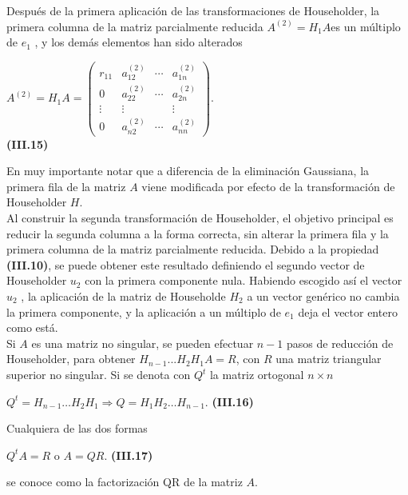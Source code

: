 \documentclass[twocolumn,twoside]{article}
\begin{document}
Despu\'es de la primera aplicaci\'on de las transformaciones de Householder, la primera
columna de la matriz parcialmente reducida $A^{(2)}=H_1 A $es un m\'ultiplo de $e_1$ , y los
dem\'as elementos han sido alterados
\begin{center}
  $A^{(2)}= H_1 A=\left(\begin{array}{cccc}
    r_{11} &a_{12}^{(2)} &\cdots &a_{1n}^{(2)} \\ 
    0 &a_{22}^{(2)} &\cdots &a_{2n}^{(2)} \\
    \vdots &\vdots &  &\vdots \\
    0 &a_{n2}^{(2)} &\cdots &a_{nn}^{(2)} 
   \end{array}\right)$. \vspace{0.2cm}\\\textbf{(III.15)}
\end{center}
En muy importante notar que a diferencia de la eliminaci\'on Gaussiana, la primera fila de
la matriz $A$ viene modificada por efecto de la transformaci\'on de Householder $H$.\\
Al construir la segunda transformaci\'on de Householder, el objetivo principal es reducir
la segunda columna a la forma correcta, sin alterar la primera fila y la primera
columna de la matriz parcialmente reducida. Debido a la propiedad \textbf{(III.10)}, se puede
obtener este resultado definiendo el segundo vector de Householder $u_2$ con la primera
componente nula. Habiendo escogido as\'i el vector $u_2$ , la aplicaci\'on de la matriz de
Householde $H_2$ a un vector gen\'erico no cambia la primera componente, y la aplicaci\'on a
un m\'ultiplo de $e_1$ deja el vector entero como est\'a.\\
Si $A$ es una matriz no singular, se pueden efectuar $n-1$ pasos de reducci\'on de
Householder, para obtener $H_{n-1} . . . H_2 H_1 A = R$, con $R$ una matriz triangular superior
no singular. Si se denota con $Q^t$ la matriz ortogonal $n\times n$
\begin{center}
  $Q^t = H_{n-1}\dots H_2 H_1 \Longrightarrow  Q = H_1 H_2 \dots H_{n-1}$. \textbf{(III.16)}
\end{center}
Cualquiera de las dos formas
\begin{center}
  $Q^t A = R$  \hspace{0.25cm}  o \hspace{0.25cm} $A = QR$. \hspace{0.5cm}\textbf{(III.17)}
\end{center}
se conoce como la factorizaci\'on QR de la matriz $A$.\\
\end{document}
